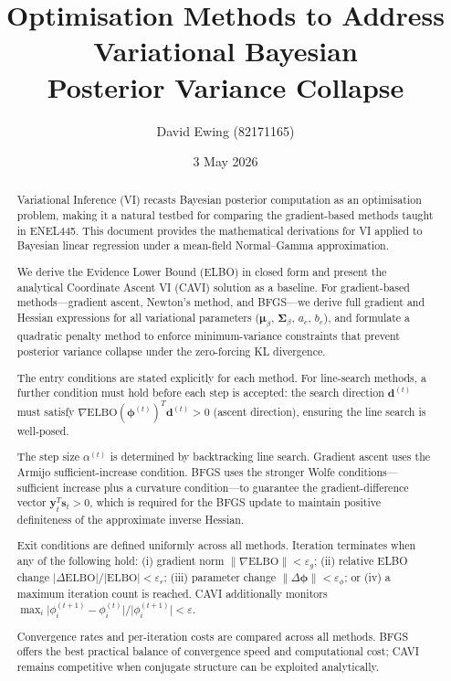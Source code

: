 \documentclass[11pt]{article}
\title{ 
Optimisation Methods to Address\\
Variational Bayesian\\
Posterior Variance Collapse
}
\author{
  David Ewing (82171165)\\
}
\date{3 May 2026}
\newcommand{\ELBO}{\text{ELBO}}
\begin{document}
\maketitle

\begin{abstract}
\setlength{\parindent}{0pt}
\setlength{\parskip}{0.7em}

Variational Inference (VI) recasts Bayesian posterior computation as an optimisation problem, making it a natural testbed for comparing the
gradient-based methods taught in ENEL445. This document provides the mathematical derivations for VI applied to Bayesian linear regression under
a mean-field Normal--Gamma approximation.

We derive the Evidence Lower Bound (ELBO) in closed form and present the
analytical Coordinate Ascent VI (CAVI) solution as a baseline. For
gradient-based methods---gradient ascent, Newton's method, and BFGS---we
derive full gradient and Hessian expressions for all variational parameters
($\bm{\mu}_\beta$, $\bm{\Sigma}_\beta$, $a_e$, $b_e$), and formulate a
quadratic penalty method to enforce minimum-variance constraints that
prevent posterior variance collapse under the zero-forcing KL divergence.

The entry conditions are stated explicitly for each method.   For line-search methods, a further
condition must hold before each step is accepted: the search direction
$\bm{d}^{(t)}$ must satisfy $\nabla\ELBO(\bm{\phi}^{(t)})^T \bm{d}^{(t)}
> 0$ (ascent direction), ensuring the line search is well-posed.

The step size $\alpha^{(t)}$ is determined by backtracking line
search. Gradient ascent uses the Armijo sufficient-increase condition. BFGS uses the stronger Wolfe conditions---sufficient
increase plus a curvature condition---to guarantee the gradient-difference
vector $\bm{y}_t^T \bm{s}_t > 0$, which is required for the BFGS update
to maintain positive definiteness of the approximate inverse Hessian.

Exit conditions are defined uniformly across all methods.
Iteration terminates when any of the following hold: (i) gradient norm
$\lVert\nabla\ELBO\rVert < \varepsilon_g$; (ii) relative ELBO change
$\lvert\Delta\ELBO\rvert / \lvert\ELBO\rvert < \varepsilon_r$; (iii)
parameter change $\lVert\Delta\bm{\phi}\rVert < \varepsilon_\phi$; or
(iv) a maximum iteration count is reached. CAVI additionally monitors
$\max_i \lvert\phi_i^{(t+1)} - \phi_i^{(t)}\rvert /
\lvert\phi_i^{(t+1)}\rvert < \varepsilon$.

Convergence rates and per-iteration costs are compared across all methods.
BFGS offers the best practical balance of convergence speed and
computational cost; CAVI remains competitive when conjugate structure can
be exploited analytically.
\end{abstract}
\newpage
\end{document}
